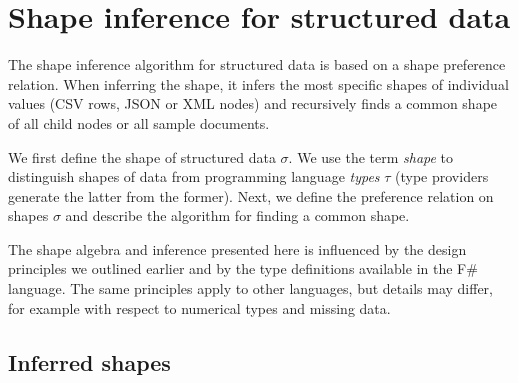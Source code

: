 \documentclass[10pt,nocopyrightspace]{sigplanconf}
\begin{document}
%
%

\section{Shape inference for structured data}
\label{sec:inference}

The shape inference algorithm for structured data is based on a shape preference relation. When
inferring the shape, it infers the most specific shapes of individual values (CSV rows, JSON or XML
nodes) and recursively finds a common shape of all child nodes or all sample documents.

We first define the shape of structured data $\sigma$. We use the term \emph{shape} to distinguish
shapes of data from programming language \emph{types} $\tau$ (type providers generate the latter from the former).
Next, we define the preference relation on shapes $\sigma$ and describe the algorithm
for finding a common shape.

The shape algebra and inference presented here is influenced by the design principles
we outlined earlier and by the type definitions available in the F\# language.
The same principles apply to other languages, but details may differ, for example
with respect to numerical types and missing data.


\subsection{Inferred shapes}
\label{sec:inference-types}
\end{document}
